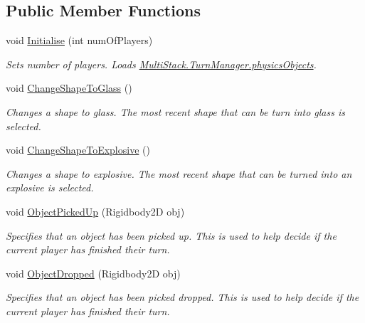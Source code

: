 \subsection*{Public Member Functions}
\begin{DoxyCompactItemize}
\item 
void \hyperlink{class_multi_stack_1_1_turn_manager_ada486b044c24c99626a87dd09c5bd44a}{Initialise} (int num\+Of\+Players)
\begin{DoxyCompactList}\small\item\em Sets number of players. Loads \hyperlink{class_multi_stack_1_1_turn_manager_a4c217abcf3dd22bc5aa3908aa68c0df3}{Multi\+Stack.\+Turn\+Manager.\+physics\+Objects}. \end{DoxyCompactList}\item 
void \hyperlink{class_multi_stack_1_1_turn_manager_a5ecde21a2b9c4d25fa781e717a946700}{Change\+Shape\+To\+Glass} ()
\begin{DoxyCompactList}\small\item\em Changes a shape to glass. The most recent shape that can be turn into glass is selected. \end{DoxyCompactList}\item 
void \hyperlink{class_multi_stack_1_1_turn_manager_a4366a75c5431c6d38c2feeb650f07d54}{Change\+Shape\+To\+Explosive} ()
\begin{DoxyCompactList}\small\item\em Changes a shape to explosive. The most recent shape that can be turned into an explosive is selected. \end{DoxyCompactList}\item 
void \hyperlink{class_multi_stack_1_1_turn_manager_a91108690df912e6108e9fb618df72708}{Object\+Picked\+Up} (Rigidbody2\+D obj)
\begin{DoxyCompactList}\small\item\em Specifies that an object has been picked up. This is used to help decide if the current player has finished their turn. \end{DoxyCompactList}\item 
void \hyperlink{class_multi_stack_1_1_turn_manager_aaca45e591f6687226f10d9a9e385e7f9}{Object\+Dropped} (Rigidbody2\+D obj)
\begin{DoxyCompactList}\small\item\em Specifies that an object has been picked dropped. This is used to help decide if the current player has finished their turn. \end{DoxyCompactList}\item 

\end{DoxyCompactItemize}
